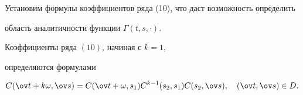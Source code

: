 Установим формулы коэффициентов ряда (10), что даст возможность определить


область аналитичности функции $\Gamma(t,s,\cdot)$.





\begin{lem}


Коэффициенты ряда $(10)$, начиная с $k=1$,


определяются формулами


\begin{equation}


C(\ov t+k\omega,\ov s)=C(\ov t+\omega,s_1)


C^{k-1} (s_2,s_1)C(s_2,\ov s),\quad (\ov t,\ov s)\in D.


\end{equation}


\end{lem}





